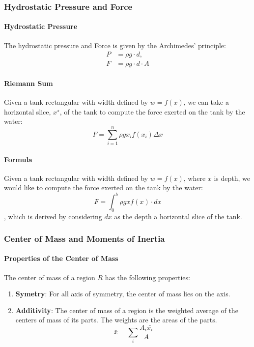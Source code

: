 \documentclass[11pt]{report}
\begin{document}
\subsubsection{Hydrostatic Pressure and Force}
\paragraph{Hydrostatic Pressure} The hydrostatic pressure and Force is given by the Archimedes' principle:
\begin{subequations}
    \begin{align}
        P &= \rho g \cdot d, \\
        F &= \rho g \cdot d \cdot A
    \end{align}
\end{subequations}
\paragraph{Riemann Sum} Given a tank rectangular with width defined by $w = f(x)$, we can take a horizontal slice, $x^\star$, of the tank to compute the force exerted on the tank by the water:
\begin{equation}
    F =\sum_{i=1}^n \rho g x_i f(x_i) \Delta x
\end{equation}
\paragraph{Formula} Given a tank rectangular with width defined by $w = f(x)$, where $x$ is depth, we would like to compute the force exerted on the tank by the water:
\begin{equation}
    F = \int_0^b \rho g x f(x) \cdot dx
\end{equation}
, which is derived by considering $dx$ as the depth a horizontal slice of the tank.
\subsubsection{Center of Mass and Moments of Inertia}
\paragraph{Properties of the Center of Mass} The center of mass of a region $R$ has the following properties:
\begin{enumerate}
    \item \textbf{Symetry}: For all axis of symmetry, the center of mass lies on the axis.
    \item \textbf{Additivity}: The center of mass of a region is the weighted average of the centers of mass of its parts. The weights are the areas of the parts.
    \begin{equation}
        \bar{x} = \sum_i \frac{A_i\bar{x_i}}{A}
    \end{equation}
\end{enumerate}
\end{document}
